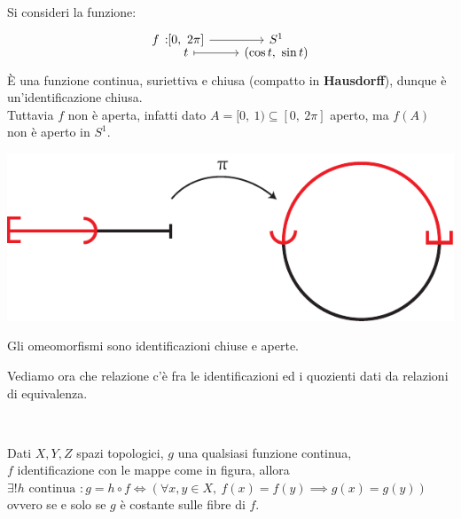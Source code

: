 \begin{example}
	Si consideri la funzione:
	\begin{equation*}
		\funztot f {[0, \ 2\pi]} {S^1} t {(\cos t, \ \sin t)}
	\end{equation*}
	È una funzione continua, suriettiva e chiusa (compatto in \textbf{Hausdorff}), dunque è un'identificazione chiusa. \\
	Tuttavia $f$ non è aperta, infatti dato $A=[0, \ 1)\subseteq [0, \ 2\pi]$ aperto, ma $f(A)$ non è aperto in $S^1$.
		\begin{center}
			\includegraphics[trim=0cm 0cm 0cm 0cm,clip,scale=0.9]{images/half_circle-eps-converted-to.pdf}
		\end{center}
	\vspace{-6mm}
\end{example}
\begin{observe}
	Gli omeomorfismi sono identificazioni chiuse e aperte.
\end{observe}
Vediamo ora che relazione c'è fra le identificazioni ed i quozienti dati da relazioni di equivalenza.
\begin{theorema}~{}\\ 
	\begin{minipage}[t]{0.83\textwidth}
		Dati $X,Y,Z$ spazi topologici, $g$ una qualsiasi funzione continua, \\
		$f$ identificazione con le mappe come in figura, allora \\
		$\exists ! h \text{ continua } \colon g=h\circ f \iff \left( \forall x,y\in X, \ f(x)=f(y)\implies g(x)=g(y)  \right)$ \\
		ovvero se e solo se $g$ è costante sulle fibre di $f$.
	\end{minipage}
	\begin{minipage}[t]{0.13\textwidth}\vspace{-10pt}
	\end{minipage}
\end{theorema}
